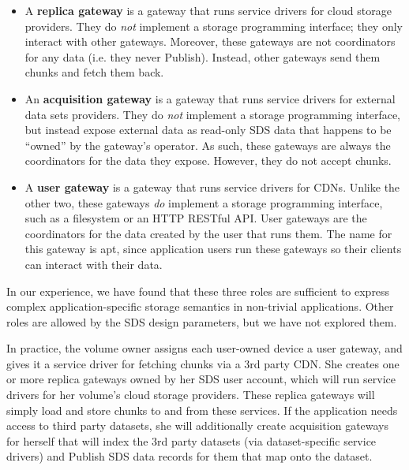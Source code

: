 \begin{itemize}
    \item A \textbf{replica gateway} is a gateway that runs service drivers for
cloud storage providers.  They do \emph{not} implement a storage programming
interface; they only interact with other gateways.  Moreover, these gateways are
not coordinators for any data (i.e. they never Publish).  Instead, other gateways send
them chunks and fetch them back.
    \item An \textbf{acquisition gateway} is a gateway that runs service drivers
for external data sets providers.  They do \emph{not} implement a storage
programming interface, but instead expose external data as read-only SDS data that happens
to be ``owned'' by the gateway's operator.  As such, these gateways are always
the coordinators for the data they expose.  However, they do not accept chunks.
    \item A \textbf{user gateway} is a gateway that runs service drivers for
CDNs.  Unlike the other two, these gateways \emph{do} implement a storage
programming interface, such as a filesystem or an HTTP RESTful API.
User gateways are the coordinators for the data created by the user that runs
them.  The name for this gateway is apt, since application users run
these gateways so their clients can interact with their data.
\end{itemize}

In our experience, we have found that these three roles are sufficient to
express complex application-specific storage semantics in non-trivial
applications.  Other roles are allowed by the SDS design parameters, but we have
not explored them.

In practice, the volume owner assigns each user-owned device a
user gateway, and gives it a service driver for fetching chunks via a 3rd party
CDN.  She creates one or more replica gateways owned by her SDS user account,
which will run service drivers for her volume's cloud storage providers.  These
replica gateways will simply load and store chunks to and from these services.
If the application needs access to
third party datasets, she will additionally create acquisition gateways for
herself that will index the 3rd party datasets (via dataset-specific service
drivers) and Publish SDS data records for them that map onto the dataset.

